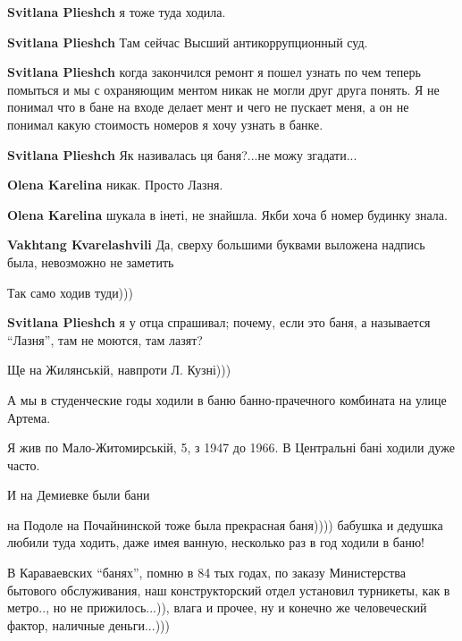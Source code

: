 \begin{itemize}
\begin{itemize} %
\textbf{Svitlana Plieshch} я тоже туда ходила.

\textbf{Svitlana Plieshch} Там сейчас Высший антикоррупционный суд.

\textbf{Svitlana Plieshch} когда закончился ремонт я пошел узнать по чем теперь помыться и мы с охраняющим ментом никак не могли друг друга понять. Я не понимал что в бане на входе делает мент и чего не пускает меня, а он не понимал какую стоимость номеров я хочу узнать в банке.

\textbf{Svitlana Plieshch} Як називалась ця баня?...не можу згадати...

\begin{itemize} %
\textbf{Olena Karelina} никак. Просто Лазня.

\textbf{Olena Karelina} шукала в інеті, не знайшла. Якби хоча б номер будинку знала.

\textbf{Vakhtang Kvarelashvili} Да, сверху большими буквами выложена надпись была, невозможно не заметить
\end{itemize} %

Так само ходив туди)))

\textbf{Svitlana Plieshch} я у отца спрашивал; почему, если это баня, а называется \enquote{Лазня}, там не моются, там лазят?
\end{itemize} %

Ще на Жилянській, навпроти Л. Кузні)))

А мы в студенческие годы ходили в баню банно-прачечного комбината на улице Артема.

Я жив по Мало-Житомирській, 5, з 1947 до 1966. В Центральні бані ходили дуже часто.

И на Демиевке были бани


на Подоле на Почайнинской тоже была прекрасная баня)))) бабушка и дедушка
любили туда ходить, даже имея ванную, несколько раз в год ходили в баню!



В Караваевских \enquote{банях}, помню в 84 тых годах, по заказу Министерства бытового
обслуживания, наш конструкторский отдел установил турникеты, как в метро.., но
не прижилось...)), влага и прочее, ну и конечно же человеческий фактор,
наличные деньги...)))


\end{itemize}
